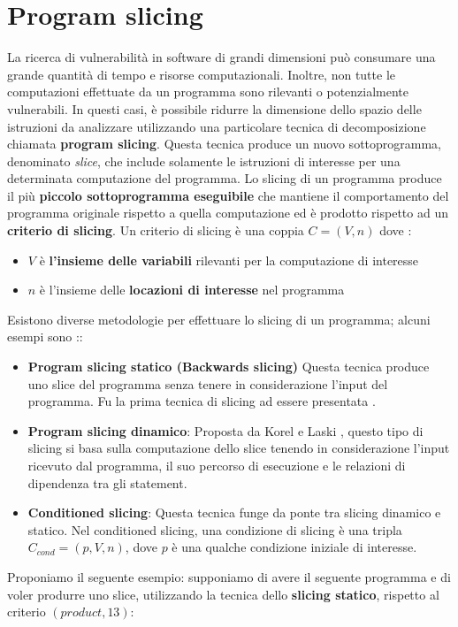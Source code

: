 \documentclass[../main.tex]{subfiles}
\begin{document}
\section{Program slicing}
La ricerca di vulnerabilità in software di grandi dimensioni può consumare una grande quantità di tempo e risorse computazionali.
Inoltre, non tutte le computazioni effettuate da un programma sono rilevanti o potenzialmente vulnerabili. 
In questi casi, è possibile ridurre la dimensione dello spazio delle istruzioni da analizzare utilizzando una particolare tecnica di decomposizione
chiamata \textbf{program slicing}.
Questa tecnica produce un nuovo sottoprogramma, denominato \textit{slice}, che include solamente le istruzioni di interesse per una determinata computazione del programma.
Lo slicing di un programma produce il più \textbf{piccolo sottoprogramma eseguibile} che mantiene il comportamento del programma originale rispetto a quella computazione ed è prodotto rispetto ad un \textbf{criterio di slicing}.
Un criterio di slicing è una coppia $C = (V, n)$ dove \cite{Sclicing}:
\begin{itemize}
    \item $V$ è \textbf{l'insieme delle variabili} rilevanti per la computazione di interesse
    \item $n$ è l'insieme delle \textbf{locazioni di interesse} nel programma 
\end{itemize}
Esistono diverse metodologie per effettuare lo slicing di un programma; alcuni esempi sono \cite{Sclicing}::
\begin{itemize}
    \item \textbf{Program slicing statico (Backwards slicing)} Questa tecnica produce uno slice del programma senza tenere in considerazione l'input del programma. Fu la prima tecnica di slicing ad essere presentata \cite{weiser1981program}.
    \item \textbf{Program slicing dinamico}: Proposta da Korel e Laski \cite{korel1988dynamic}, questo tipo di slicing si basa sulla computazione dello slice tenendo in considerazione l'input ricevuto dal programma, il suo percorso di esecuzione e le relazioni di dipendenza tra gli statement.
    \item \textbf{Conditioned slicing}: Questa tecnica funge da ponte tra slicing dinamico e statico. Nel conditioned slicing, una condizione di slicing è una tripla $C_{cond} = (p, V, n)$, dove $p$ è una qualche condizione iniziale di interesse.
\end{itemize}
\newpage \noindent
Proponiamo il seguente esempio: supponiamo di avere il seguente programma e di voler produrre uno slice, utilizzando la tecnica dello \textbf{slicing statico}, rispetto al criterio $(product, 13)$:


\end{document}
